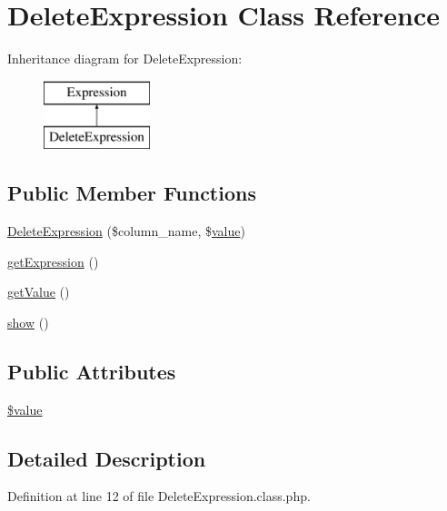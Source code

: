 \hypertarget{classDeleteExpression}{}\section{Delete\+Expression Class Reference}
\label{classDeleteExpression}
Inheritance diagram for Delete\+Expression\+:\begin{figure}[H]
\begin{center}
\leavevmode
\includegraphics[height=2.000000cm]{classDeleteExpression}
\end{center}
\end{figure}
\subsection*{Public Member Functions}
\begin{DoxyCompactItemize}
\item 
\hyperlink{classDeleteExpression_a1749423fab43333921d29c288a5c1b89}{Delete\+Expression} (\$column\+\_\+name, \$\hyperlink{jquery_8js_abe5393d870043cf6aaa1d5ad5fce755c}{value})
\item 
\hyperlink{classDeleteExpression_acf2477afffe27b73797829c852431aec}{get\+Expression} ()
\item 
\hyperlink{classDeleteExpression_a37759c2867e64b62368539706fdf9a43}{get\+Value} ()
\item 
\hyperlink{classDeleteExpression_a6e7d4bdf884830a90e0ed0aba7619f67}{show} ()
\end{DoxyCompactItemize}
\subsection*{Public Attributes}
\begin{DoxyCompactItemize}
\item 
\hyperlink{classDeleteExpression_a8e5b6ee335281d42c6e40a462b83cf64}{\$value}
\end{DoxyCompactItemize}


\subsection{Detailed Description}


Definition at line 12 of file Delete\+Expression.\+class.\+php.



